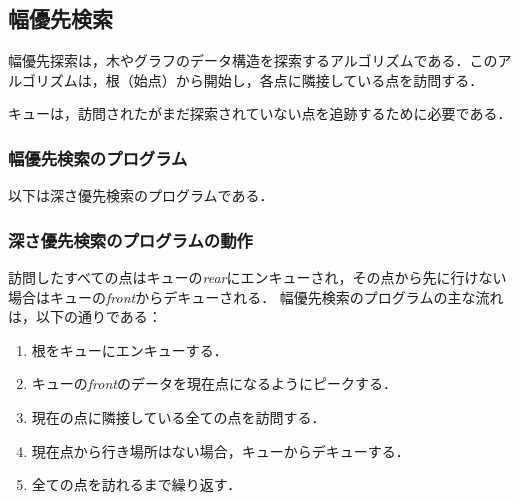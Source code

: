 \documentclass[a4j, titlepage]{jarticle}
\begin{document}
    \subsection{幅優先検索}
    幅優先探索は，木やグラフのデータ構造を探索するアルゴリズムである．このアルゴリズムは，根（始点）から開始し，各点に隣接している点を訪問する．

    キューは，訪問されたがまだ探索されていない点を追跡するために必要である．

        \subsubsection{幅優先検索のプログラム}
        以下は深さ優先検索のプログラムである．
         
        
        \subsubsection{深さ優先検索のプログラムの動作}
        訪問したすべての点はキューの\textit{rear}にエンキューされ，その点から先に行けない場合はキューの\textit{front}からデキューされる．
        幅優先検索のプログラムの主な流れは，以下の通りである：
        \begin{screen}
            \begin{enumerate}
                \item 根をキューにエンキューする．
                \item キューの\textit{front}のデータを現在点になるようにピークする．
                \item 現在の点に隣接している全ての点を訪問する．
                \item 現在点から行き場所はない場合，キューからデキューする．
                \item 全ての点を訪れるまで繰り返す．
            \end{enumerate}
        \end{screen}
        
\end{document}
